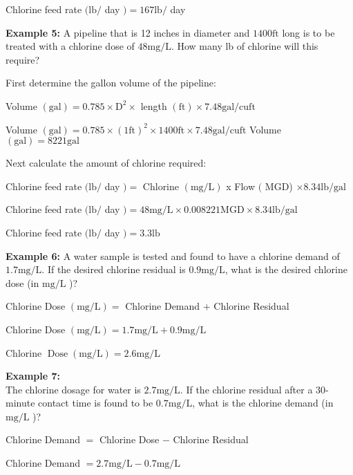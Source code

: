 Chlorine feed rate $(\mathrm{lb} /$ day $)=167 \mathrm{lb} /$ day

\textbf{Example 5:} A pipeline that is 12 inches in diameter and $1400 \mathrm{ft}$ long is to be treated with a chlorine dose of $48 \mathrm{mg} / \mathrm{L}$. How many lb of chlorine will this require?

First determine the gallon volume of the pipeline:

Volume $(\mathrm{gal})=0.785 \times \mathrm{D}^{2} \times$ length $(\mathrm{ft}) \times 7.48 \mathrm{gal} / \mathrm{cu} \mathrm{ft}$

Volume $(\mathrm{gal})=0.785 \times(1 \mathrm{ft})^{2} \times 1400 \mathrm{ft} \times 7.48 \mathrm{gal} / \mathrm{cu} \mathrm{ft}$ Volume $(\mathrm{gal})=8221 \mathrm{gal}$

Next calculate the amount of chlorine required:

Chlorine feed rate $(\mathrm{lb} /$ day $)=$ Chlorine $(\mathrm{mg} / \mathrm{L})$ x Flow $($ MGD) $\times 8.34 \mathrm{lb} / \mathrm{gal}$

Chlorine feed rate $(\mathrm{lb} /$ day $)=48 \mathrm{mg} / \mathrm{L} \times 0.008221 \mathrm{MGD} \times 8.34 \mathrm{lb} / \mathrm{gal}$

Chlorine feed rate $(\mathrm{lb} /$ day $)=3.3 \mathrm{lb}$

\textbf{Example 6:} A water sample is tested and found to have a chlorine demand of $1.7 \mathrm{mg} / \mathrm{L}$. If the desired chlorine residual is $0.9 \mathrm{mg} / \mathrm{L}$, what is the desired chlorine dose (in $\mathrm{mg} / \mathrm{L}$ )?

Chlorine Dose $(\mathrm{mg} / \mathrm{L})=$ Chlorine Demand $+$ Chlorine Residual

Chlorine Dose $(\mathrm{mg} / \mathrm{L})=1.7 \mathrm{mg} / \mathrm{L}+0.9 \mathrm{mg} / \mathrm{L}$

Chlorine $\operatorname{Dose}(\mathrm{mg} / \mathrm{L})=2.6 \mathrm{mg} / \mathrm{L}$

\textbf{Example 7:}\\
The chlorine dosage for water is $2.7 \mathrm{mg} / \mathrm{L}$. If the chlorine residual after a 30-minute contact time is found to be $0.7 \mathrm{mg} / \mathrm{L}$, what is the chlorine demand (in $\mathrm{mg} / \mathrm{L}$ )?

Chlorine Demand $=$ Chlorine Dose $-$ Chlorine Residual

Chlorine Demand $=2.7 \mathrm{mg} / \mathrm{L}-0.7 \mathrm{mg} / \mathrm{L}$


